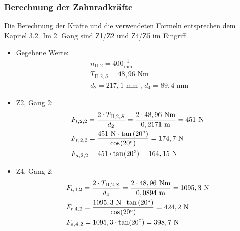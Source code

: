 \subsubsection{Berechnung der Zahnradkräfte}
Die Berechnung der Kräfte und die verwendeten Formeln entsprechen dem Kapitel 3.2. Im 2. Gang sind Z1/Z2 und Z4/Z5 im Eingriff.
\begin{itemize}
\item Gegebene Werte: 
	\begin{align*}
	&n_{\mathrm{II},2} = 400\frac{1}{\text{min}} \\
	&T_{\mathrm{II},2,S} = 48,96\text{ Nm} \\
	&d_2 = 217,1\text{ mm} \text{ , } d_4 = 89,4 \text{ mm } 
	\end{align*}
\item Z2, Gang 2:
	\begin{align*} 
	&F_{t,2,2} = \frac{2\cdot T_{\mathrm{II},2,S}}{d_2} = \frac{2 \cdot 48,96 \text{ Nm}}{0,2171 \text{ m}} = 451 \text{ N}\\ 
	&F_{r,2,2} = \frac{451 \text{ N} \cdot \tan{(20^\circ)}}{\cos(20^\circ)} = 174,7\text{ N}\\ 
	&F_{a,2,2} =451 \cdot \tan(20^\circ) =164,15 \text{ N}
	\end{align*}
\item Z4, Gang 2:
	\begin{align*} 
	&F_{t,4,2} = \frac{2\cdot T_{\mathrm{II},2,S}}{d_4} = \frac{2 \cdot 48,96 \text{ Nm}}{0,0894 \text{ m}} = 1095,3 \text{ N}\\ 
	&F_{r,4,2} = \frac{1095,3 \text{ N} \cdot \tan{(20^\circ)}}{\cos(20^\circ)} = 424,2\text{ N}\\ 
	&F_{a,4,2} =1095,3 \cdot \tan(20^\circ) =398,7 \text{ N}
	\end{align*}
\end{itemize}
